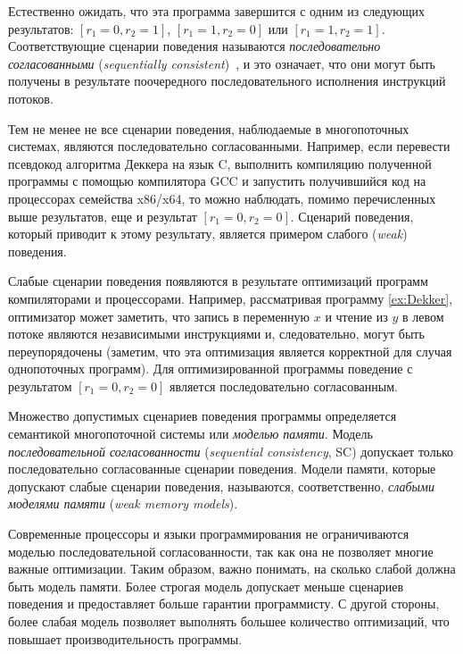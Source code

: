 Естественно ожидать, что эта программа 
завершится с одним из следующих результатов: 
${[r_1=0, r_2=1]}$, ${[r_1=1,r_2=0]}$ или ${[r_1=1,r_2=1]}$. 
Соответствующие сценарии поведения называются 
\emph{последовательно согласованными} 
(\emph{sequentially consistent})~\cite{Lamport:TC79}, и это означает, 
что они могут быть получены в результате поочередного последовательного 
исполнения инструкций потоков. 

Тем не менее не все сценарии поведения, наблюдаемые в
многопоточных системах, являются последовательно согласованными.
Например, если перевести псевдокод алгоритма Деккера
на язык C, выполнить компиляцию полученной программы с помощью компилятора GCC
и запустить получившийся код на процессорах семейства x86/x64, то
можно наблюдать, помимо перечисленных выше результатов, еще и результат $[r_1=0, r_2=0]$. 
Сценарий поведения, который приводит к этому результату, 
является примером слабого (\emph{weak}) поведения.

Слабые сценарии поведения появляются в результате оптимизаций программ
компиляторами и процессорами. Например, 
рассматривая программу \ref{ex:Dekker}, 
оптимизатор может заметить, что запись в переменную $x$
и чтение из $y$ в левом потоке являются независимыми инструкциями 
и, следовательно, могут быть переупорядочены
(заметим, что эта оптимизация является корректной 
для случая однопоточных программ).
Для оптимизированной программы поведение с результатом
$[r_1=0, r_2=0]$ является последовательно согласованным.

Множество допустимых сценариев поведения программы определяется
семантикой многопоточной системы или \emph{моделью памяти}.
Модель \emph{последовательной согласованности}
(\emph{sequential consistency}, SC) допускает 
только последовательно согласованные сценарии поведения.
Модели памяти, которые допускают слабые сценарии поведения, 
называются, соответственно, \emph{слабыми моделями памяти}
(\emph{weak memory models}).

Современные процессоры и языки программирования 
не ограничиваются моделью последовательной согласованности, 
так как она не позволяет многие важные оптимизации.
Таким образом, важно понимать, на сколько слабой 
должна быть модель памяти. Более строгая модель допускает меньше сценариев поведения 
и предоставляет больше гарантии программисту.
С другой стороны, более слабая модель позволяет
выполнять большее количество оптимизаций, что повышает производительность программы. 

